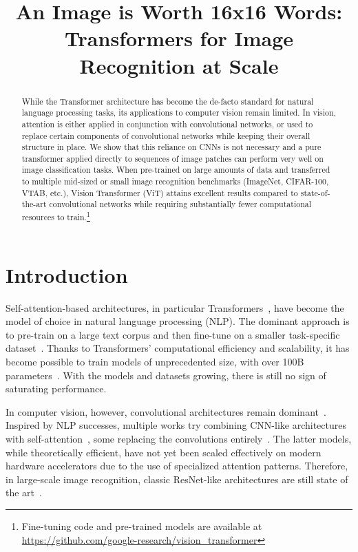 \title{An Image is Worth 16x16 Words: Transformers for Image Recognition at Scale}

\begin{abstract}
While the Transformer architecture has become the de-facto standard for natural language processing tasks, its applications to computer vision remain limited. In vision, attention is either applied in conjunction with convolutional networks, or used to replace certain components of convolutional networks while keeping their overall structure in place. We show that this reliance on CNNs is not necessary and a pure transformer applied directly to sequences of image patches can perform very well on image classification tasks. When pre-trained on large amounts of data and transferred to multiple mid-sized or small image recognition benchmarks (ImageNet, CIFAR-100, VTAB, etc.), Vision Transformer (ViT) attains excellent results compared to state-of-the-art convolutional networks while requiring substantially fewer computational resources to train.\footnote{Fine-tuning code and pre-trained models are available at \url{https://github.com/google-research/vision_transformer}}
\end{abstract}

\section{Introduction}

Self-attention-based architectures, in particular Transformers~\citep{vaswani2017}, have become the model of choice in natural language processing (NLP). The dominant approach is to pre-train on a large text corpus and then fine-tune on a smaller task-specific dataset~\citep{devlin19-bert}. Thanks to Transformers' computational efficiency and scalability, it has become possible to train models of unprecedented size, with over 100B parameters~\citep{brown2020-gpt3,lepikhin2020gshard}. With the models and datasets growing, there is still no sign of saturating performance.

In computer vision, however, convolutional architectures remain dominant~\citep{LeCun1989BackpropagationAT,KrizhevskyNIPS12,he2016deep}. Inspired by NLP successes, multiple works try combining CNN-like architectures with self-attention~\citep{wang2018-nonlocalnn,carion20-detr}, some replacing the convolutions entirely~\citep{ramachandran19-sasa,wang2020-axialdeeplab}. The latter models, while theoretically efficient, have not yet been scaled effectively on modern hardware accelerators due to the use of specialized attention patterns. Therefore, in large-scale image recognition, classic ResNet-like architectures are still state of the art~\citep{mahajan2018,xie2020-noisystudent,kolesnikov2020-bit}.

